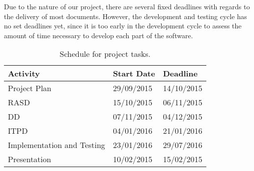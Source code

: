 Due to the nature of our project, there are several fixed deadlines with regards to the delivery of most documents. However, the development and testing cycle has no set deadlines 
yet, since it is too early in the development cycle to assess the amount of time necessary to develop each part of the software.

\begin{table}[h]
    \centering
    \begin{tabular}{| l | l | l |}
        \hline
        \textbf{Activity}   & \textbf{Start Date}   & \textbf{Deadline} \\
		\hline
        Project Plan				& 29/09/2015		& 14/10/2015\\
        \hline
        RASD						& 15/10/2015		& 06/11/2015\\
		\hline
        DD							& 07/11/2015		& 04/12/2015\\
		\hline
        ITPD						& 04/01/2016		& 21/01/2016\\
		\hline
		Implementation and Testing	& 23/01/2016		& 29/07/2016\\
        \hline
        Presentation				& 10/02/2015		& 15/02/2015\\
		\hline
        
    \end{tabular}
    \caption{Schedule for project tasks.}
    \label{tab:schedule}
\end{table}

